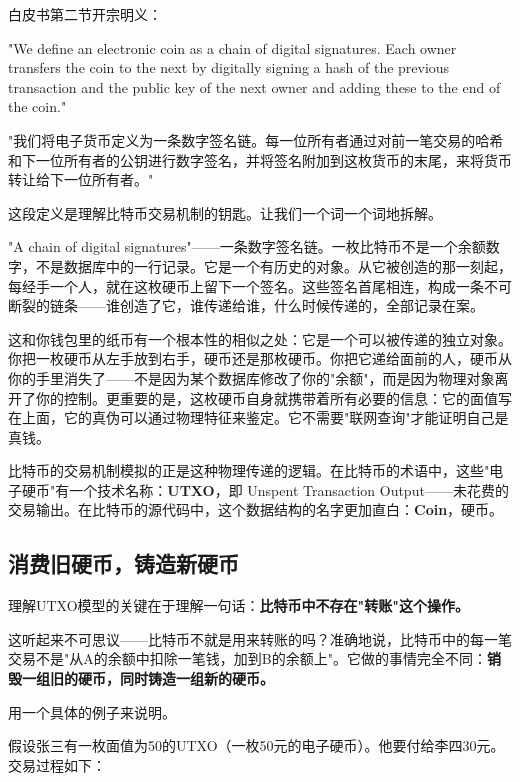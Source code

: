 \documentclass[a4paper,12pt,openany]{ctexbook}
\newenvironment{quoting}{%
  \par\vspace{0.5em}%
  \begin{list}{}{%
    \setlength{\leftmargin}{2em}%
    \setlength{\rightmargin}{2em}%
    \setlength{\parsep}{0.3em}%
    \setlength{\itemsep}{0pt}%
    \setlength{\topsep}{0pt}%
  }%
  \item\relax
}{%
  \end{list}%
  \par\vspace{0.5em}%
}
\begin{document}
白皮书第二节开宗明义：


\begin{quoting}
\small
"We define an electronic coin as a chain of digital signatures. Each owner transfers the coin to the next by digitally signing a hash of the previous transaction and the public key of the next owner and adding these to the end of the coin."

"我们将电子货币定义为一条数字签名链。每一位所有者通过对前一笔交易的哈希和下一位所有者的公钥进行数字签名，并将签名附加到这枚货币的末尾，来将货币转让给下一位所有者。"
\end{quoting}


这段定义是理解比特币交易机制的钥匙。让我们一个词一个词地拆解。

"A chain of digital signatures"——一条数字签名链。一枚比特币不是一个余额数字，不是数据库中的一行记录。它是一个有历史的对象。从它被创造的那一刻起，每经手一个人，就在这枚硬币上留下一个签名。这些签名首尾相连，构成一条不可断裂的链条——谁创造了它，谁传递给谁，什么时候传递的，全部记录在案。

这和你钱包里的纸币有一个根本性的相似之处：它是一个可以被传递的独立对象。你把一枚硬币从左手放到右手，硬币还是那枚硬币。你把它递给面前的人，硬币从你的手里消失了——不是因为某个数据库修改了你的"余额"，而是因为物理对象离开了你的控制。更重要的是，这枚硬币自身就携带着所有必要的信息：它的面值写在上面，它的真伪可以通过物理特征来鉴定。它不需要"联网查询"才能证明自己是真钱。

比特币的交易机制模拟的正是这种物理传递的逻辑。在比特币的术语中，这些"电子硬币"有一个技术名称：\textbf{UTXO}，即 Unspent Transaction Output——未花费的交易输出。在比特币的源代码中，这个数据结构的名字更加直白：\textbf{Coin}，硬币。


\subsection*{消费旧硬币，铸造新硬币}


理解UTXO模型的关键在于理解一句话：\textbf{比特币中不存在"转账"这个操作。}

这听起来不可思议——比特币不就是用来转账的吗？准确地说，比特币中的每一笔交易不是"从A的余额中扣除一笔钱，加到B的余额上"。它做的事情完全不同：\textbf{销毁一组旧的硬币，同时铸造一组新的硬币。}

用一个具体的例子来说明。

假设张三有一枚面值为50的UTXO（一枚50元的电子硬币）。他要付给李四30元。交易过程如下：
\end{document}
